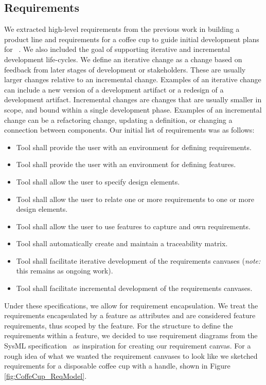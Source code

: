 \subsection{Requirements}
We extracted high-level requirements from the previous work in building a product line and requirements for a coffee cup to guide initial development plans for \tool~\cite{chiang2024mapping}. We also included the goal of supporting iterative and incremental development life-cycles. We define an iterative change as a change based on feedback from later stages of development or stakeholders. These are usually larger changes relative to an incremental change. Examples of an iterative change can include a new version of a development artifact or a redesign of a development artifact. Incremental changes are changes that are usually smaller in scope, and bound within a single development phase. Examples of an incremental change can be a refactoring change, updating a definition, or changing a connection between components. Our initial list of requirements was as follows:

\begin{itemize}
	\item Tool shall provide the user with an environment for defining requirements.
	\item Tool shall provide the user with an environment for defining features.
	\item Tool shall allow the user to specify design elements.
	\item Tool shall allow the user to relate one or more requirements to one or more design elements.
	\item Tool shall allow the user to use features to capture and own requirements.
	\item Tool shall automatically create and maintain a traceability matrix.
	\item Tool shall facilitate iterative development of the requirements canvases (\textit{note:} this remains as ongoing work).
	\item Tool shall facilitate incremental development of the requirements canvases.
\end{itemize}

Under these specifications, we allow for requirement encapsulation. We treat the requirements encapsulated by a feature as attributes and are considered feature requirements, thus scoped by the feature. For the structure to define the requirements within a feature, we decided to use requirement diagrams from the SysML specification~\cite{sysml2019omg} as inspiration for creating our requirement canvas. For a rough idea of what we wanted the requirement canvases to look like we sketched requirements for a disposable coffee cup with a handle, shown in Figure \ref{fig:CoffeCup_ReqModel}.


